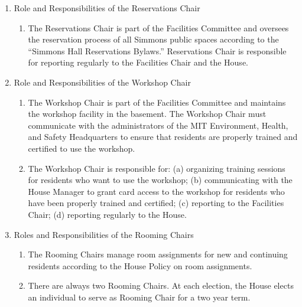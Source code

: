 \documentclass[letterpaper]{article}
\begin{document}
\begin{enumerate}
\begin{enumerate}
\begin{enumerate}
\end{enumerate}

\item Role and Responsibilities of the Reservations Chair 

\begin{enumerate}

\item The Reservations Chair is part of the Facilities Committee and oversees the reservation process of all Simmons public spaces according to the ``Simmons Hall Reservations Bylaws.'' Reservations Chair is responsible for reporting regularly to the Facilities Chair and the House. 

\end{enumerate}

\item Role and Responsibilities of the Workshop Chair 

\begin{enumerate}

\item The Workshop Chair is part of the Facilities Committee and maintains the workshop facility in the basement. The Workshop Chair must communicate with the administrators of the MIT Environment, Health, and Safety Headquarters to ensure that residents are properly trained and certified to use the workshop.

\item The Workshop Chair is responsible for: (a) organizing training sessions for residents who want to use the workshop; (b) communicating with the House Manager to grant card access to the workshop for residents who have been properly trained and certified; (c) reporting to the Facilities Chair; (d) reporting regularly to the House.

\end{enumerate}

\item Roles and Responsibilities of the Rooming Chairs

\begin{enumerate}

\item The Rooming Chairs manage room assignments for new and continuing residents according to the House Policy on room assignments.

\item There are always two Rooming Chairs. At each election, the House elects an individual to serve as Rooming Chair for a two year term.


\end{enumerate}
\end{enumerate}
\end{enumerate}
\end{document}
